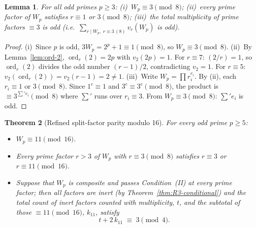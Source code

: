 \documentclass[12pt]{article}
\theoremstyle{plain}
\newtheorem{theorem}{Theorem}[section]
\newtheorem{lemma}[theorem]{Lemma}
\theoremstyle{definition}
\theoremstyle{remark}
\begin{document}
\begin{lemma}\label{lem:mod-8-exclusion}
For all odd primes \(p \geq 3\):
\textup{(i)}~\(W_p \equiv 3 \pmod{8}\);
\textup{(ii)}~every prime factor of \(W_p\) satisfies
\(r \equiv 1\) or \(3 \pmod{8}\);
\textup{(iii)}~the total multiplicity of prime factors
\(\equiv 3\) is odd (i.e.\ \(\sum_{r \mid W_p,\; r \equiv 3\,(8)} v_r(W_p)\) is odd).
\end{lemma}

\begin{proof}
(i)~Since \(p\) is odd, \(3W_p = 2^p + 1 \equiv 1 \pmod{8}\),
so \(W_p \equiv 3 \pmod{8}\).
(ii)~By Lemma~\ref{lem:ord-2}, \(\operatorname{ord}_r(2) = 2p\)
with \(v_2(2p) = 1\). For \(r \equiv 7\): \((2/r) = 1\), so
\(\operatorname{ord}_r(2)\) divides the odd number \((r-1)/2\),
contradicting \(v_2 = 1\). For \(r \equiv 5\):
\(v_2(\operatorname{ord}_r(2)) = v_2(r-1) = 2 \neq 1\).
(iii)~Write \(W_p = \prod r_i^{e_i}\). By (ii), each
\(r_i \equiv 1\) or \(3 \pmod{8}\). Since
\(1^e \equiv 1\) and \(3^e \equiv 3^e \pmod{8}\), the product
is \(\equiv 3^{\sum' e_i} \pmod{8}\) where \(\sum'\) runs over
\(r_i \equiv 3\). From \(W_p \equiv 3 \pmod{8}\): \(\sum' e_i\)
is odd.\end{proof}

\begin{theorem}[Refined split-factor parity modulo 16]\label{thm:sfp-mod16}
For every odd prime \(p \geq 5\):
\begin{itemize}
\item[\textup{(a)}] \(W_p \equiv 11 \pmod{16}\).
\item[\textup{(b)}] Every prime factor \(r > 3\) of \(W_p\) with
  \(r \equiv 3 \pmod 8\) satisfies \(r \equiv 3\) or
  \(r \equiv 11 \pmod{16}\).
\item[\textup{(c)}] Suppose that \(W_p\) is composite and passes
  Condition~(II) at every prime factor; then all factors are inert
  (by Theorem~\ref{thm:R3-conditional}) and the total count of
  inert factors counted with multiplicity, \(t\), and the subtotal
  of those \(\equiv 11 \pmod{16}\), \(k_{11}\), satisfy
  \[
    t + 2\,k_{11} \;\equiv\; 3 \pmod{4}.
  \]
\end{itemize}
\end{theorem}
\end{document}
